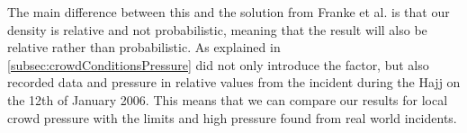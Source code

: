 The main difference between this and the solution from Franke et al. is that our density is relative and not probabilistic, meaning that the result will also be relative rather than probabilistic. As explained in \cref{subsec:crowdConditionsPressure} \citet{empircalstudy} did not only introduce the factor, but also recorded data and pressure in relative values from the incident during the Hajj on the 12th of January 2006\cite{website:Wikipedia-Hajj}. This means that we can compare our results for local crowd pressure with the limits and high pressure found from real world incidents.



